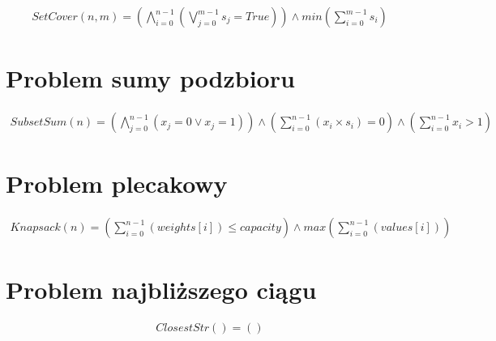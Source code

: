 \begin{align*}
	SetCover(n, m) = \left( \bigwedge_{i=0}^{n-1} (\bigvee_{j=0}^{m-1} s_j = True) \right) \land 
	min \left( \sum_{i=0}^{m-1} s_i \right) 
\end{align*}

\section{Problem sumy podzbioru}

\begin{align*}
	SubsetSum(n) = \left( \bigwedge_{j=0}^{n-1} (x_j = 0 \lor x_j = 1) \right) \land 
	\left( \sum_{i=0}^{n-1} (x_i \times s_i) = 0 \right) \land 
	\left( \sum_{i=0}^{n-1} x_i > 1 \right)
\end{align*}

\section{Problem plecakowy}

\begin{align*}
	Knapsack(n) = \left( \sum_{i=0}^{n-1} (weights[i]) \leq capacity \right) \land 
	max \left( \sum_{i=0}^{n-1} (values[i]) \right)
\end{align*}

\section{Problem najbliższego ciągu}

\begin{align*}
	ClosestStr() = \left(  \right) 
\end{align*}
